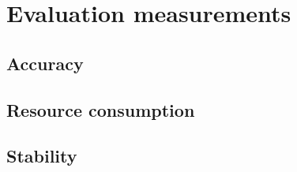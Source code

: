 \chapter{Evaluation measurements}
\label{appendix:evaluation-measurements}

\section{Accuracy}
\section{Resource consumption}
\section{Stability}

